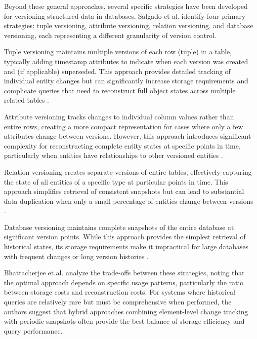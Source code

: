 Beyond these general approaches, several specific strategies have been developed for versioning structured data in databases. Salgado et al. \cite{salzberg1999comparison} identify four primary strategies: tuple versioning, attribute versioning, relation versioning, and database versioning, each representing a different granularity of version control.

Tuple versioning maintains multiple versions of each row (tuple) in a table, typically adding timestamp attributes to indicate when each version was created and (if applicable) superseded. This approach provides detailed tracking of individual entity changes but can significantly increase storage requirements and complicate queries that need to reconstruct full object states across multiple related tables \cite{bhattacherjee2015principles}.

Attribute versioning tracks changes to individual column values rather than entire rows, creating a more compact representation for cases where only a few attributes change between versions. However, this approach introduces significant complexity for reconstructing complete entity states at specific points in time, particularly when entities have relationships to other versioned entities \cite{biriukov2018implementation}.

Relation versioning creates separate versions of entire tables, effectively capturing the state of all entities of a specific type at particular points in time. This approach simplifies retrieval of consistent snapshots but can lead to substantial data duplication when only a small percentage of entities change between versions \cite{mueller2018conception}.

Database versioning maintains complete snapshots of the entire database at significant version points. While this approach provides the simplest retrieval of historical states, its storage requirements make it impractical for large databases with frequent changes or long version histories \cite{bhattacherjee2015principles}.

Bhattacherjee et al. \cite{bhattacherjee2015principles} analyze the trade-offs between these strategies, noting that the optimal approach depends on specific usage patterns, particularly the ratio between storage costs and reconstruction costs. For systems where historical queries are relatively rare but must be comprehensive when performed, the authors suggest that hybrid approaches combining element-level change tracking with periodic snapshots often provide the best balance of storage efficiency and query performance.

